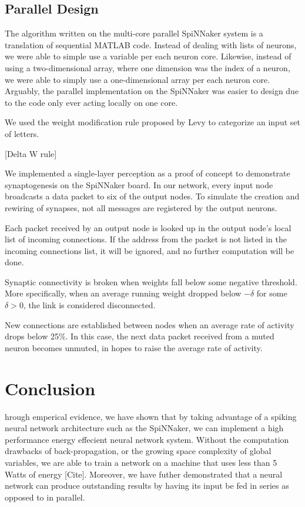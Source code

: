 \documentclass[journal]{./sty/IEEEtran}
\begin{document}
\subsection{Parallel Design}
The algorithm written on the multi-core parallel SpiNNaker system is a translation of sequential MATLAB code.
Instead of dealing with lists of neurons, we were able to simple use a variable per each neuron core.
Likewise, instead of using a two-dimensional array, where one dimension was the index of a neuron, 
we were able to simply use a one-dimensional array per each neuron core.
Arguably, the parallel implementation on the SpiNNaker was easier to design due to the code only ever acting locally on one core.


We used the weight modification rule proposed by Levy to categorize an input set of letters. 

\vspace{0.5cm}
[Delta W rule]
\vspace{0.5cm}

We implemented a single-layer perception as a proof of concept to demonstrate synaptogenesis on the SpiNNaker board. In our network, every input node broadcasts a data packet to six of the output nodes. To simulate the creation and rewiring of synapses, not all messages are registered by the output neurons. 

Each packet received by an output node is looked up in the output node's local list of incoming connections. If the address from the packet is not listed in the incoming connections list, it will be ignored, and no further computation will be done.

Synaptic connectivity is broken when weights fall below some negative threshold. More specifically, when an average running weight dropped below \(-\delta\) for some \(\delta > 0\), the link is considered disconnected.

New connections are established between nodes when an average rate of activity drops below 25\%. In this case, the next data packet received from a muted neuron becomes unmuted, in hopes to raise the average rate of activity.



\section{Conclusion}
hrough emperical evidence, we have shown that by taking advantage of a spiking neural network architecture such as the SpiNNaker, 
we can implement a high performance energy effecient neural network system. 
Without the computation drawbacks of back-propagation, or the growing space complexity of global variables, 
we are able to train a network on a machine that uses less than 5 Watts of energy [Cite].
Moreover, we have futher demonstrated that a neural network can produce outstanding results by having its input be fed in series as opposed to in parallel.
\end{document}

